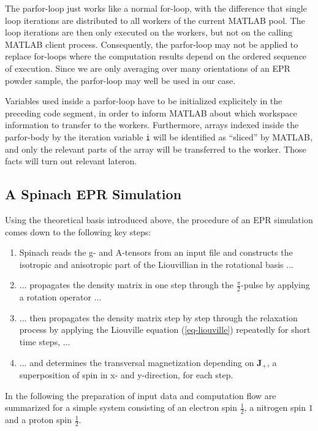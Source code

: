\documentclass[11.5pt,a4paper]{article}
\begin{document}
The parfor-loop just works like a normal for-loop, with the difference that single loop iterations are distributed to all workers of the current MATLAB pool. The loop iterations are then only executed on the workers, but not on the calling MATLAB client process. Consequently, the parfor-loop may not be applied to replace for-loops where the computation results depend on the ordered sequence of execution. Since we are only averaging over many orientations of an EPR powder sample, the parfor-loop may well be used in our case. 

Variables used inside a parfor-loop have to be initialized explicitely in the preceding code segment, in order to inform MATLAB about which workspace information to transfer to the workers. Furthermore, arrays indexed inside the parfor-body by the iteration variable \verb$i$ will be identified as ``sliced'' by MATLAB, and only the relevant parts of the array will be transferred to the worker. Those facts will turn out relevant lateron. %

\subsection{A Spinach EPR Simulation}
\label{sec-spinach-computation}
Using the theoretical basis introduced above, the procedure of an EPR simulation comes down to the following key steps:
\begin{enumerate}
 \item Spinach reads the g- and A-tensors from an input file and constructs the isotropic and anisotropic part of the Liouvillian in the rotational basis ...
 \item ... propagates the density matrix in one step through the $\tfrac{\pi}{2}$-pulse by applying a rotation operator ...
  \item ... then propagates the density matrix step by step through the relaxation process by applying the Liouville equation (\ref{eq-liouville}) repeatedly for short time steps, ...
 \item ... and determines the transversal magnetization depending on $\mathbf{J_+}$, a superposition of spin in x- and y-direction, for each step.
\end{enumerate}

In the following the preparation of input data and computation flow are summarized for a simple system consisting of an electron spin $\tfrac{1}{2}$, a nitrogen spin $1$ and a proton spin $\tfrac{1}{2}$.%
\end{document}
